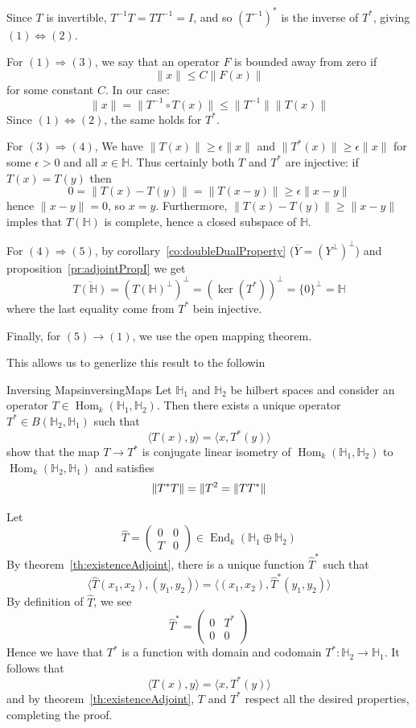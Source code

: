 \documentclass[oneside]{book}
\renewcommand{\H}{\mathbb{H}}
\newcommand{\oln}{\overline}
\newcommand{\Hom}{\operatorname{Hom}}
\newcommand{\End}{\operatorname{End}}
\newcommand{\Rw}{\Rightarrow}
\newcommand{\LRw}{\Leftrightarrow}
\begin{document}
\begin{Proof}
	Since $T$ is invertible, $T^{-1}T = TT^{-1} = I$, and so $(T^{-1})^*$ is the inverse of $T^*$, giving $(1)
	\LRw (2)$.

	For $(1) \Rw (3)$, we say that an operator $F$ is bounded away from zero if
	\[
		\|x\| \le C\|F(x)\|
	\]
	for some constant $C$. In our case:
	\[
		\|x\| = \|T^{-1}\circ T(x)\| \le \|T^{-1}\|\|T(x)\|
	\]
	Since $(1) \LRw (2)$, the same holds for $T^*$.

	For $(3) \Rw (4)$, We have $\|T(x)\| \ge \epsilon\|x\|$ and $\|T^*(x)\| \ge \epsilon\|x\|$ for some $\epsilon
	> 0$ and all $x \in \H$. Thus certainly both $T$ and $T^*$ are injective: if $T(x) = T(y)$ then
	\[
		0 =\|T(x) - T(y)\| =\|T(x-y)\| \ge \epsilon\|x-y\|
	\]
	hence $\|x-y\| = 0$, so $x = y$. Furthermore, $\|T(x) - T(y)\| \ge \|x-y\|$ imples that $T(\H)$ is
	complete, hence a closed subspace of $\H$.

	For $(4) \Rw (5)$, by corollary~\ref{co:doubleDualProperty} ($\oln{Y} = (Y^\perp)^\perp$) and
	proposition~\ref{pr:adjointPropI} we get
	\[
		\oln{T(\H)} = (T(\H)^\perp)^\perp = (\ker(T^*))^\perp = \{0\}^\perp = \H
	\]
	where the last equality come from $T^*$ bein injective.

	Finally, for $(5) \to (1)$, we use the open mapping theorem.
\end{Proof}

This allows us to generlize this result to the followin
\begin{prop}{Inversing Maps}{inversingMaps}
	 Let $\H_1$ and $\H_2$ be hilbert spaces and consider an operator $T \in \Hom_k(\H_1, \H_2)$. Then
		there exists a unique operator $T^* \in B(\H_2, \H_1)$ such that
		\[
			 \langle T(x), y \rangle = \langle x, T^*(y) \rangle
		 \]
		 show that the map $T \to T^*$ is conjugate linear isometry of $\Hom_k(\H_1, \H_2)$ to
		 $\Hom_k(\H_2, \H_1)$ and satisfies
		 \[
			 \|T^*T\| = \|T\\^2 = \|TT^*\|
		 \]
\end{prop}

\begin{Proof}
	 Let
	 \[
		\hat{T} =
	 \begin{pmatrix}
		 0 & 0\\
		 T & 0
	 \end{pmatrix} \in \End_k(\H_1\oplus \H_2)
	 \]
	 By theorem~\ref{th:existenceAdjoint}, there is a unique function $\hat{T}^*$ such that
	 \[
	 	\langle \widehat{T}(x_1, x_2), (y_1, y_2) \rangle = \langle (x_1, x_2), \widehat{T}^*(y_1, y_2) \rangle
	 \]
	 By definition of
	 $\widehat{T}$, we see
	 \[
		 \widehat{T}^* = \begin{pmatrix}
			 0& T^*\\
			0 & 0
		 \end{pmatrix}
	 \]
	 Hence we have that $T^*$ is a function with domain and codomain $T^*: \H_2 \to \H_1$. It
	 follows that
	 \[
		 \langle T(x), y \rangle = \langle x, T^*(y) \rangle
	 \]
	 and by theorem~\ref{th:existenceAdjoint}, $T$ and $T^*$ respect all the desired properties, completing the proof.
\end{Proof}
\end{document}
